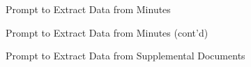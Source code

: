 \documentclass[12pt,english,hyperfootnotes=false,hidelinks]{article}
\begin{document}
\pagebreak

\begin{figure}[H]
\caption{Prompt to Extract Data from Minutes} \label{fig_minutes_prompt}
\vspace{-0.6cm}
\begin{center}
\fbox{
\begin{minipage}{\textwidth}
\texttt{
\footnotesize

}
\end{minipage}
}
\end{center}
\end{figure}

\pagebreak

\begin{figure}[H]\ContinuedFloat
\caption{Prompt to Extract Data from Minutes (cont'd)} \vspace{-0.6cm}
\begin{center}
\fbox{
\begin{minipage}{\textwidth}
\texttt{
\footnotesize

}
\end{minipage}
}
\end{center}
\end{figure}

\pagebreak

\begin{figure}[H]
\caption{Prompt to Extract Data from Supplemental Documents} \label{fig_supplemental_docs_prompt}
\vspace{-0.6cm}
\begin{center}
\fbox{
\begin{minipage}{\textwidth}
\texttt{
\footnotesize

}
\end{minipage}
}
\end{center}
\end{figure}
\end{document}
